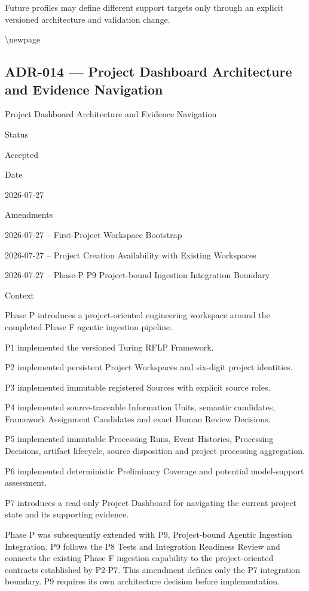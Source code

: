 Future profiles may define different support targets only through an explicit versioned architecture and validation change.

\textbackslash newpage

\hypertarget{adr-014--project-dashboard-architecture-and-evidence-navigation}{%
\subsection{ADR-014 --- Project Dashboard Architecture and Evidence Navigation}\label{adr-014--project-dashboard-architecture-and-evidence-navigation}}

Project Dashboard Architecture and Evidence Navigation

Status

Accepted

Date

2026-07-27

Amendments

2026-07-27 -- First-Project Workspace Bootstrap

2026-07-27 -- Project Creation Availability with Existing Workspaces

2026-07-27 -- Phase-P P9 Project-bound Ingestion Integration Boundary

Context

Phase P introduces a project-oriented engineering workspace around the completed Phase F agentic ingestion pipeline.

P1 implemented the versioned Turing RFLP Framework.

P2 implemented persistent Project Workspaces and six-digit project identities.

P3 implemented immutable registered Sources with explicit source roles.

P4 implemented source-traceable Information Units, semantic candidates, Framework Assignment Candidates and exact Human Review Decisions.

P5 implemented immutable Processing Runs, Event Histories, Processing Decisions, artifact lifecycle, source disposition and project processing aggregation.

P6 implemented deterministic Preliminary Coverage and potential model-support assessment.

P7 introduces a read-only Project Dashboard for navigating the current project state and its supporting evidence.

Phase P was subsequently extended with P9, Project-bound Agentic Ingestion Integration. P9 follows the P8 Tests and Integration Readiness Review and connects the existing Phase F ingestion capability to the project-oriented contracts established by P2-P7. This amendment defines only the P7 integration boundary. P9 requires its own architecture decision before implementation.

